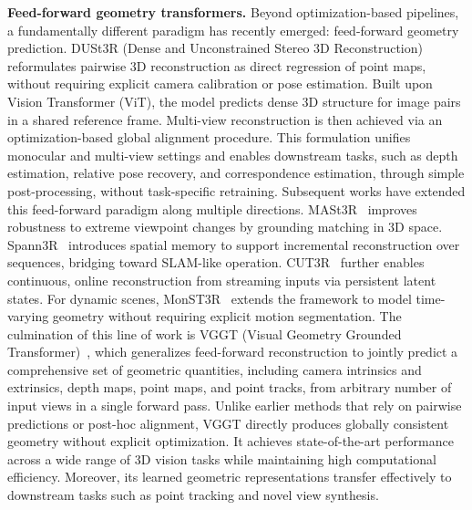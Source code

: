 \noindent\textbf{Feed-forward geometry transformers.} Beyond optimization-based pipelines, a fundamentally different paradigm has recently emerged: feed-forward geometry prediction.
DUSt3R (Dense and Unconstrained Stereo 3D Reconstruction)~\cite{wang2024dust3r} reformulates pairwise 3D reconstruction as direct regression of point maps, without requiring explicit camera calibration or pose estimation.
Built upon Vision Transformer (ViT), the model predicts dense 3D structure for image pairs in a shared reference frame.
Multi-view reconstruction is then achieved via an optimization-based global alignment procedure.
This formulation unifies monocular and multi-view settings and enables downstream tasks, such as depth estimation, relative pose recovery, and correspondence estimation, through simple post-processing, without task-specific retraining.
Subsequent works have extended this feed-forward paradigm along multiple directions.
MASt3R~\cite{leroy2024grounding} improves robustness to extreme viewpoint changes by grounding matching in 3D space.
Spann3R~\cite{wang20253d} introduces spatial memory to support incremental reconstruction over sequences, bridging toward SLAM-like operation.
CUT3R~\cite{wang2025continuous} further enables continuous, online reconstruction from streaming inputs via persistent latent states.
For dynamic scenes, MonST3R~\cite{zhang2025monstr} extends the framework to model time-varying geometry without requiring explicit motion segmentation.
The culmination of this line of work is VGGT (Visual Geometry Grounded Transformer)~\cite{wang2025vggt}, which generalizes feed-forward reconstruction to jointly predict a comprehensive set of geometric quantities, including camera intrinsics and extrinsics, depth maps, point maps, and point tracks, from arbitrary number of input views in a single forward pass.
Unlike earlier methods that rely on pairwise predictions or post-hoc alignment, VGGT directly produces globally consistent geometry without explicit optimization.
It achieves state-of-the-art performance across a wide range of 3D vision tasks while maintaining high computational efficiency.
Moreover, its learned geometric representations transfer effectively to downstream tasks such as point tracking and novel view synthesis.

